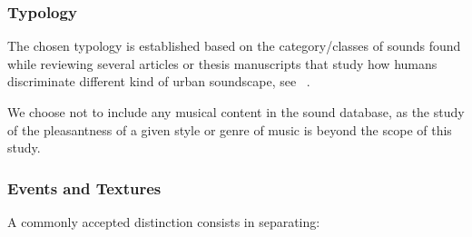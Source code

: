 \documentclass[12pt]{elsarticle}
\newcommand{\etc}{\emph{etc.}}
\begin{document}
\subsubsection*{Typology}


The chosen typology is established based on the category/classes of sounds found while reviewing several articles or thesis manuscripts that study how humans discriminate different kind of urban soundscape, see~\cite{leobon_analyse_1986,maffiolo_caracterisation_1999,raimbault2002simulation,guastavino_etude_2003,defreville2004aactivity,beaumont2004pertinence,raimbault2005urban,dubois2006cognitive,devergie_relations_2006,guastavino2006ideal,polack2008perceptive,niessen2010categories,brown2011towards} .


We choose not to include any musical content in the sound database, as the study of the pleasantness of a given style or genre of music is beyond the scope of this study.


\subsubsection*{Events and Textures}

A commonly accepted distinction consists in separating:
\end{document}
